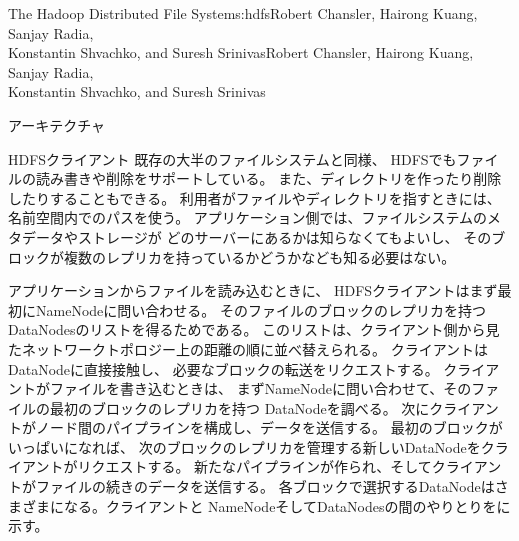 \begin{aosachaptertoc}{The Hadoop Distributed File System}{s:hdfs}{Robert Chansler, Hairong Kuang, Sanjay Radia, \\ Konstantin Shvachko, and Suresh Srinivas}{Robert Chansler, Hairong Kuang, Sanjay Radia, \\ \hspace*{0.9cm} Konstantin Shvachko, and Suresh Srinivas}
\begin{aosasect1}{アーキテクチャ}
\begin{aosasect2}{HDFSクライアント}
既存の大半のファイルシステムと同様、
HDFSでもファイルの読み書きや削除をサポートしている。
また、ディレクトリを作ったり削除したりすることもできる。
利用者がファイルやディレクトリを指すときには、名前空間内でのパスを使う。
アプリケーション側では、ファイルシステムのメタデータやストレージが
どのサーバーにあるかは知らなくてもよいし、
そのブロックが複数のレプリカを持っているかどうかなども知る必要はない。

アプリケーションからファイルを読み込むときに、
HDFSクライアントはまず最初にNameNodeに問い合わせる。
そのファイルのブロックのレプリカを持つDataNodesのリストを得るためである。
このリストは、クライアント側から見たネットワークトポロジー上の距離の順に並べ替えられる。
クライアントはDataNodeに直接接触し、
必要なブロックの転送をリクエストする。
クライアントがファイルを書き込むときは、
まずNameNodeに問い合わせて、そのファイルの最初のブロックのレプリカを持つ
DataNodeを調べる。
次にクライアントがノード間のパイプラインを構成し、データを送信する。
最初のブロックがいっぱいになれば、
次のブロックのレプリカを管理する新しいDataNodeをクライアントがリクエストする。
新たなパイプラインが作られ、そしてクライアントがファイルの続きのデータを送信する。
各ブロックで選択するDataNodeはさまざまになる。クライアントと
NameNodeそしてDataNodesの間のやりとりをに示す。


\end{aosasect2}
\end{aosasect1}
\end{aosachaptertoc}
